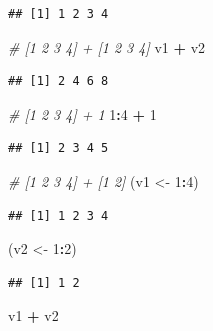 \documentclass[
]{book}
\newenvironment{Shaded}{\begin{snugshade}}{\end{snugshade}}
\newcommand{\CommentTok}[1]{\textcolor[rgb]{0.56,0.35,0.01}{\textit{#1}}}
\newcommand{\DecValTok}[1]{\textcolor[rgb]{0.00,0.00,0.81}{#1}}
\newcommand{\NormalTok}[1]{#1}
\newcommand{\OtherTok}[1]{\textcolor[rgb]{0.56,0.35,0.01}{#1}}
\newcommand{\SpecialCharTok}[1]{\textcolor[rgb]{0.81,0.36,0.00}{\textbf{#1}}}
\begin{document}
\begin{verbatim}
## [1] 1 2 3 4
\end{verbatim}

\begin{Shaded}
\begin{Highlighting}[]
\CommentTok{\# [1 2 3 4] + [1 2 3 4]}
\NormalTok{v1 }\SpecialCharTok{+}\NormalTok{ v2}
\end{Highlighting}
\end{Shaded}

\begin{verbatim}
## [1] 2 4 6 8
\end{verbatim}

\begin{Shaded}
\begin{Highlighting}[]
\CommentTok{\# [1 2 3 4] + 1}
\DecValTok{1}\SpecialCharTok{:}\DecValTok{4} \SpecialCharTok{+} \DecValTok{1}
\end{Highlighting}
\end{Shaded}

\begin{verbatim}
## [1] 2 3 4 5
\end{verbatim}

\begin{Shaded}
\begin{Highlighting}[]
\CommentTok{\# [1 2 3 4] + [1 2]}
\NormalTok{(v1 }\OtherTok{\textless{}{-}} \DecValTok{1}\SpecialCharTok{:}\DecValTok{4}\NormalTok{)}
\end{Highlighting}
\end{Shaded}

\begin{verbatim}
## [1] 1 2 3 4
\end{verbatim}

\begin{Shaded}
\begin{Highlighting}[]
\NormalTok{(v2 }\OtherTok{\textless{}{-}} \DecValTok{1}\SpecialCharTok{:}\DecValTok{2}\NormalTok{)}
\end{Highlighting}
\end{Shaded}

\begin{verbatim}
## [1] 1 2
\end{verbatim}

\begin{Shaded}
\begin{Highlighting}[]
\NormalTok{v1 }\SpecialCharTok{+}\NormalTok{ v2}
\end{Highlighting}
\end{Shaded}
\end{document}
